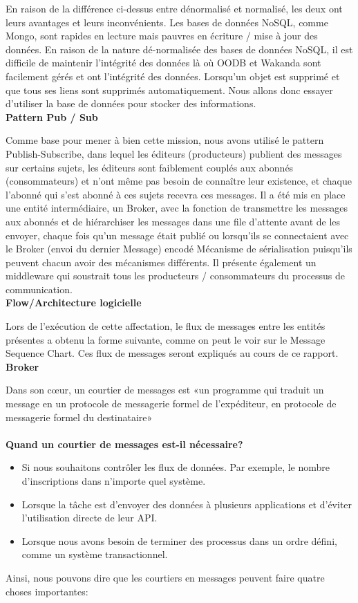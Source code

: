En raison de la différence ci-dessus entre dénormalisé et normalisé, les deux ont leurs avantages et leurs inconvénients. Les bases de données NoSQL, comme Mongo, sont rapides en lecture mais pauvres en écriture / mise à jour des données. En raison de la nature dé-normalisée des bases de données NoSQL, il est difficile de maintenir l'intégrité des données là où OODB et Wakanda sont facilement gérés et ont l'intégrité des données. Lorsqu'un objet est supprimé et que tous ses liens sont supprimés automatiquement.
Nous allons donc essayer d'utiliser la base de données pour stocker des informations.\\

\textbf{Pattern Pub / Sub}

Comme base pour mener à bien cette mission, nous avons utilisé le pattern Publish-Subscribe, dans lequel les éditeurs (producteurs) publient des messages sur certains sujets, les éditeurs sont faiblement couplés aux abonnés (consommateurs) et n'ont même pas besoin de connaître leur existence, et chaque l'abonné qui s'est abonné à ces sujets recevra ces messages. Il a été mis en place une entité intermédiaire, un Broker, avec la fonction de transmettre les messages aux abonnés et de hiérarchiser les messages dans une file d'attente avant de les envoyer, chaque fois qu'un message était publié ou lorsqu'ils se connectaient avec le Broker (envoi du dernier Message) encodé Mécanisme de sérialisation puisqu'ils peuvent chacun avoir des mécanismes différents. Il présente également un middleware qui soustrait tous les producteurs / consommateurs du processus de communication.\\

\textbf{Flow/Architecture logicielle}

Lors de l'exécution de cette affectation, le flux de messages entre les entités présentes a obtenu la forme suivante, comme on peut le voir sur le Message Sequence Chart. Ces flux de messages seront expliqués au cours de ce rapport.\\


\textbf{Broker}

Dans son cœur, un courtier de messages est «un programme qui traduit un message en un protocole de messagerie formel de l'expéditeur, en protocole de messagerie formel du destinataire»\\
\textbf{\\Quand un courtier de messages est-il nécessaire?}\\
\begin{itemize}
	\item Si nous souhaitons contrôler les flux de données. Par exemple, le nombre d'inscriptions dans n'importe quel système.
	\item Lorsque la tâche est d'envoyer des données à plusieurs applications et d'éviter l'utilisation directe de leur API.
	\item Lorsque nous avons besoin de terminer des processus dans un ordre défini, comme un système transactionnel.
\end{itemize}
Ainsi, nous pouvons dire que les courtiers en messages peuvent faire quatre choses importantes:

